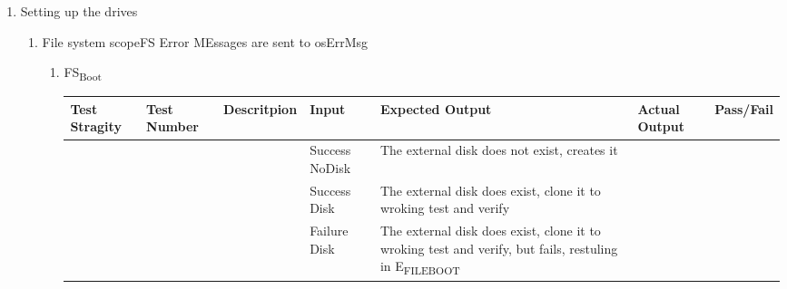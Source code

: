 \documentclass{article}
\begin{document}
\begin{enumerate}
\item Setting up the drives
\label{sec:orgde2e093}
\begin{enumerate}
\item File system scope\hfill{}\textsc{FS}
\label{sec:orge66d38d}
Error MEssages are sent to osErrMsg
\begin{enumerate}
\item FS\textsubscript{Boot}
\label{sec:org405506d}
\begin{center}
\begin{tabular}{lllllll}
Test Stragity & Test Number & Descritpion & Input & Expected Output & Actual Output & Pass/Fail\\
\hline
 &  &  & Success NoDisk & The external disk does not exist, creates it &  & \\
 &  &  & Success Disk & The external disk does  exist, clone it to wroking test and verify &  & \\
 &  &  & Failure Disk & The external disk does  exist, clone it to wroking test and verify, but fails, restuling in E\textsubscript{FILE}\textsubscript{BOOT} &  & \\
\end{tabular}
\end{center}


\end{enumerate}
\end{enumerate}
\end{enumerate}
\end{document}
